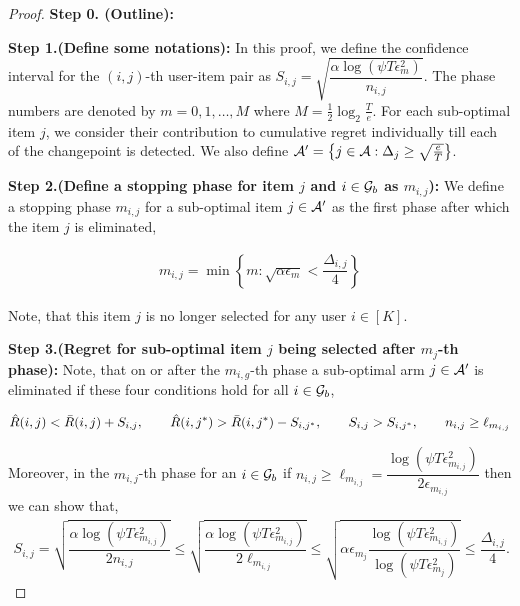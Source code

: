 \begin{proof}

\textbf{Step 0. (Outline):} 

\textbf{Step 1.(Define some notations):} In this proof,  we define the confidence interval for the $(i,j)$-th user-item pair as $S_{i,j}=\sqrt{\dfrac{\alpha\log(\psi T\epsilon_m^2)}{n_{i,j}}}$. The phase numbers are denoted by $m=0,1,\ldots,M$ where $M=\frac{1}{2}\log_{2}\frac{T}{e}$. For each sub-optimal item $j$, we consider their contribution to cumulative regret individually till each of the changepoint is detected. We also define $\mathcal{A}'=\big\lbrace j\in\mathcal{A}: \Delta_{j}\geq \sqrt{\frac{e}{T}} \big\rbrace$.

\textbf{Step 2.(Define a stopping phase for item $j$ and $i\in\mathcal{G}_b$ as  $m_{i,j}$):} We define a stopping phase $m_{i,j}$ for a sub-optimal item $j\in\mathcal{A}'$ as the first phase after which the item $j$ is eliminated,

\begin{align*}
m_{i,j} = \min\left\lbrace m: \sqrt{\alpha\epsilon_{m}} < \dfrac{\Delta_{i,j}}{4} \right\rbrace
\end{align*} 

Note, that this item $j$ is no longer selected for any user $i\in[K]$.

\textbf{Step 3.(Regret for sub-optimal item $j$ being selected after $m_{j}$-th phase):} Note, that on or after the $m_{i,g}$-th phase a sub-optimal arm $j\in\mathcal{A}'$ is eliminated if these four conditions hold for all $i\in\mathcal{G}_b$,

\begin{eqnarray}
\hat{R}(i,j) < \bar{R}(i,j) + S_{i,j}, \hspace*{2em}  \hat{R}(i,j^*) > \bar{R}(i,j^*) - S_{i,j^*}, \hspace*{2em} S_{i,j} > S_{i,j^*}, \hspace*{2em} n_{i,j} \geq \ell_{m_{i,j}} \label{eq:arm-pull}
\end{eqnarray}

Moreover, in the $m_{i,j}$-th phase for an $i\in\mathcal{G}_b$ if $n_{i,j} \geq \ell_{m_{i,j}} = \dfrac{\log(\psi T\epsilon_{m_{i,j}}^2)}{2\epsilon_{m_{i,j}}}$ then we can show that,
\begin{align*}
S_{i,j} = \sqrt{\dfrac{\alpha\log(\psi T\epsilon_{m_{i,j}}^2)}{2n_{i,j}}} \leq \sqrt{\dfrac{\alpha\log(\psi T\epsilon_{m_{i,j}}^2)}{2\ell_{m_{i,j}}}} \leq \sqrt{\alpha\epsilon_{m_{j}}\dfrac{\log(\psi T\epsilon_{m_{i,j}}^2)}{\log(\psi T\epsilon_{m_{j}}^2)}} \leq \dfrac{\Delta_{i,j}}{4}.
\end{align*}


\end{proof}
